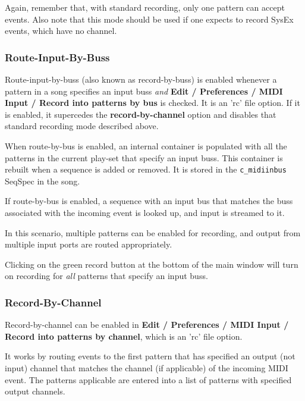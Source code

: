    Again, remember that, with standard recording, only one pattern can
   accept events.
   Also note that this mode should be used if one
   expects to record SysEx events, which have no channel.

\subsubsection{Route-Input-By-Buss}
\label{subsubsec:recording_route_by_buss}

   Route-input-by-buss (also known as record-by-buss)
   is enabled whenever a pattern in a song specifies an
   input buss \textsl{and}
   \textbf{Edit / Preferences / MIDI Input / Record into patterns by
   bus} is checked. It is an 'rc' file option.
   If it is enabled, it supercedes the
   \textbf{record-by-channel} option and
   disables that standard recording mode described above.

   When route-by-bus is enabled, an internal container is populated with
   all the patterns in the current play-set that specify an input buss.
   This container is rebuilt when a sequence is added or removed.
   It is stored in the \texttt{c\_midiinbus} SeqSpec in the song.

   If route-by-bus is enabled, a sequence with an input bus that matches the
   buss associated with the incoming event is looked up, and input is
   streamed to it.

   In this scenario, multiple patterns can be enabled for recording,
   and output from multiple input ports are routed appropriately.

   Clicking on the green record button at the bottom of the main window
   will turn on recording for \textsl{all}
   patterns that specify an input buss.

\subsubsection{Record-By-Channel}
\label{subsubsec:recording_record_by_channel}

   Record-by-channel can be enabled in
   \textbf{Edit / Preferences / MIDI Input / Record into patterns by
   channel}, which is an 'rc' file option.

   It works by routing events to the first pattern that has specified an 
   output (not input) channel that matches the channel (if applicable) of
   the incoming MIDI event.
   The patterns applicable are entered into a list of patterns with specified
   output channels.

